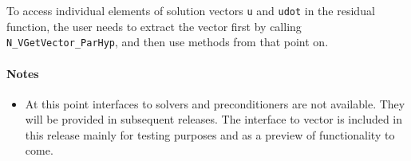 To access individual elements of solution vectors \verb|u| and \verb|udot| 
in the residual function, the user needs to extract the {\hypre} vector first 
by calling \verb|N_VGetVector_ParHyp|, and then use {\hypre} methods from 
that point on. 

\paragraph{\bf Notes} 
           
\begin{itemize}
                                        
\item
  {\warn}At this point interfaces to {\hypre} solvers and preconditioners are 
  not available. They will be provided in subsequent {\sundials} releases. 
  The interface to {\hypre} vector is included in this release mainly for 
  testing purposes and as a preview of functionality to come.

\end{itemize}





